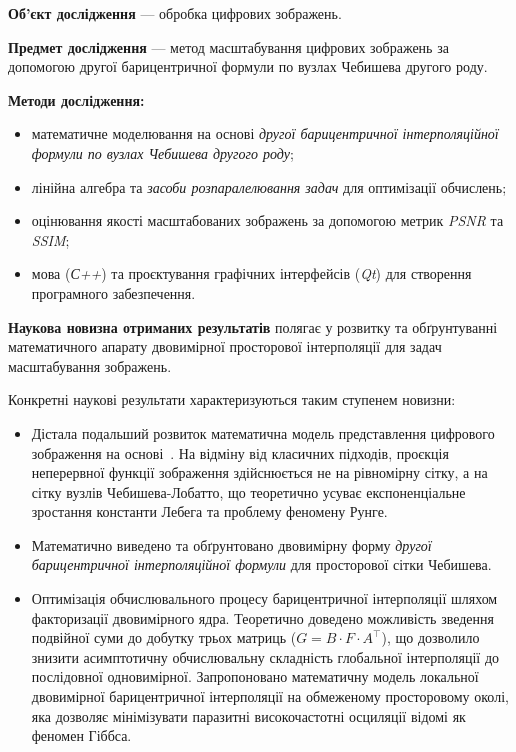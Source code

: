 \textbf{Об'єкт дослідження} — обробка цифрових зображень.

\textbf{Предмет дослідження} — метод масштабування цифрових зображень за допомогою другої барицентричної формули по вузлах Чебишева другого роду.

\textbf{Методи дослідження:}
\begin{itemize}
	\item математичне моделювання на основі \textit{другої барицентричної інтерполяційної формули по вузлах Чебишева другого роду};
	\item лінійна алгебра та \textit{засоби розпаралелювання задач} для оптимізації обчислень;
	\item оцінювання якості масштабованих зображень за допомогою метрик \textit{PSNR} та  \textit{SSIM};
	\item мова (\textit{С++}) та проєктування графічних інтерфейсів (\textit{Qt}) для створення програмного забезпечення.
\end{itemize}

\textbf{Наукова новизна отриманих результатів} полягає у розвитку та обґрунтуванні математичного апарату двовимірної просторової інтерполяції для задач масштабування зображень.

Конкретні наукові результати характеризуються таким ступенем новизни:
\begin{itemize}
	\item Дістала подальший розвиток математична модель представлення цифрового зображення на основі~\cite{occorsio2022lagrange}. На відміну від класичних підходів, проєкція неперервної функції зображення здійснюється не на рівномірну сітку, а на сітку вузлів Чебишева-Лобатто, що теоретично усуває експоненціальне зростання константи Лебега та проблему феномену Рунге.
	\item Математично виведено та обґрунтовано двовимірну форму \textit{другої барицентричної інтерполяційної формули} для просторової сітки Чебишева.
	\item Оптимізація обчислювального процесу барицентричної інтерполяції шляхом факторизації двовимірного ядра. Теоретично доведено можливість зведення подвійної суми до добутку трьох матриць ($G = B \cdot F \cdot A^\top$), що дозволило знизити асимптотичну обчислювальну складність глобальної інтерполяції до послідовної одновимірної. Запропоновано математичну модель локальної двовимірної барицентричної інтерполяції на обмеженому просторовому околі, яка дозволяє мінімізувати паразитні високочастотні осциляції відомі як феномен Гіббса.
\end{itemize}

